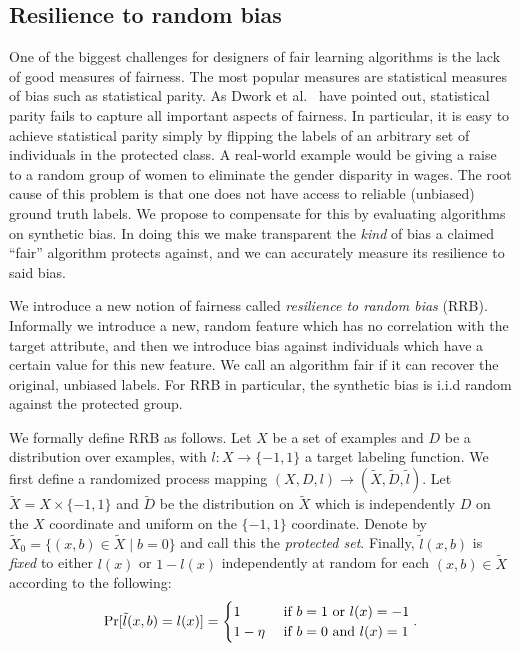 \documentclass[twoside,leqno,twocolumn]{article}
\begin{document}
\subsection{Resilience to random bias}\label{sec:rrb}
One of the biggest challenges for designers of fair learning algorithms is
the lack of good measures of fairness. The most popular measures are
statistical measures of bias such as statistical parity. As Dwork et
al.~\cite{DworkHPR12} have pointed out, statistical parity fails to capture all
important aspects of fairness. In particular, it is easy to achieve statistical
parity simply by flipping the labels of an arbitrary set of individuals in the
protected class. A real-world example would be giving a raise to a random group
of women to eliminate the gender disparity in wages.  The root cause of this
problem is that one does not have access to reliable (unbiased) ground truth
labels. We propose to compensate for this by evaluating algorithms on synthetic
bias. In doing this we make transparent the \emph{kind} of bias a claimed
``fair'' algorithm protects against, and we can accurately measure its
resilience to said bias.

We introduce a new notion of fairness called \emph{resilience to random bias}
(RRB). Informally we introduce a new, random feature which has no correlation
with the target attribute, and then we introduce bias against individuals which
have a certain value for this new feature.  We call an algorithm fair if it can
recover the original, unbiased labels. For RRB in particular, the synthetic
bias is i.i.d random against the protected group.

We formally define RRB as follows. Let $X$ be a set of examples and $D$ be a
distribution over examples, with $l:X \to \{-1,1\}$ a target labeling function.
We first define a randomized process mapping $(X,D,l) \to (\tilde X, \tilde D,
\tilde l)$. Let $\tilde X = X \times \{ -1,1 \}$ and $\tilde D$ be the
distribution on $\tilde X$ which is independently $D$ on the $X$ coordinate and
uniform on the $\{-1,1\}$ coordinate. Denote by $\tilde X_0 = \{ (x,b) \in
\tilde X \mid b=0 \}$ and call this the \emph{protected set}. Finally, $\tilde
l(x,b)$ is \emph{fixed} to either $l(x)$ or $1-l(x)$ independently at random
for each $(x,b) \in \tilde X$ according to the following: $$ \Pr[\tilde l(x,b)
= l(x)] = \begin{cases} 1      & \textup{ if } b=1 \textup{ or } l(x) = -1 \\
1-\eta & \textup{ if } b=0 \textup{ and } l(x) = 1 \\ \end{cases}.  $$
\end{document}
